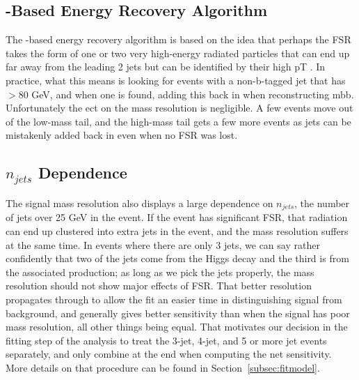 \subsection{\pt-Based Energy Recovery Algorithm}
The \pt-based energy recovery algorithm is based on the idea that perhaps the FSR takes the form of one
 or two very high-energy radiated particles that can end up far away from the leading 2 jets but can be
 identified by their high pT . In practice, what this means is looking for events with a non-b-tagged jet that
 has \pt$>$80 GeV, and when one is found, adding this back in when reconstructing mbb.
 Unfortunately the ect on the mass resolution is negligible. A few events move out of the low-mass
 tail, and the high-mass tail gets a few more events as jets can be mistakenly added back in even when no
 FSR was lost.






\subsection{$n_{jets}$ Dependence}
\label{sec:n_jets_sig}

The signal mass resolution also displays a large dependence on $n_{jets}$, the 
number of jets over 25 GeV in the event.  If the event has significant FSR,
that radiation can end up clustered into extra jets in the event, and the 
mass resolution suffers at the same time.  In events where there are only 3 jets,
we can say rather confidently that two of the jets come from the Higgs decay
and the third is from the associated production; as long as we pick the jets
properly, the mass resolution should not show major effects of FSR.  That 
better resolution propagates through to allow the fit an easier time in distinguishing
signal from background, and generally gives better sensitivity than 
when the signal has poor mass resolution, all other things being equal.  
That motivates our decision in the fitting step of the analysis to treat
the 3-jet, 4-jet, and 5 or more jet events separately, and only combine at the
end when computing the net sensitivity.  More details on that procedure can 
be found in Section~\ref{subsec:fitmodel}.



